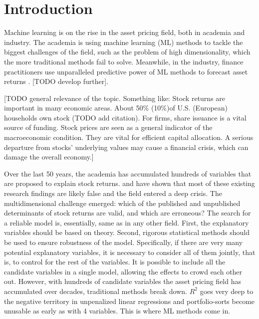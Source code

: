 \chapter{Introduction}
\label{chap:int}

Machine learning is on the rise in the asset pricing field, both in academia and industry. The academia is using machine learning (ML) methods to tackle the biggest challenges of the field, such as the problem of high dimensionality, which the more traditional methods fail to solve. Meanwhile, in the industry, finance practitioners use unparalleled predictive power of ML methods to forecast asset returns \citep{gu2020empirical}. [TODO develop further].    

[TODO general relevance of the topic. Something like: Stock returns are important in many economic areas. About 50\% (10\%)of U.S. (European) households own stock (TODO add citation). For firms, share issuance is a vital source of funding. Stock prices are seen as a general indicator of the macroeconomic condition. They are vital for efficient capital allocation. A serious departure from stocks' underlying values may cause a financial crisis, which can damage the overall economy.] 

Over the last 50 years, the academia has accumulated hundreds of variables that are proposed to explain stock returns. \cite{harvey2016and} and \cite{mclean2016does} have shown that most of these existing research findings are likely false and the field entered a deep crisis. The multidimensional challenge \citep{cochrane2011presidential} emerged: which of the published and unpublished determinants of stock returns are valid, and which are erroneous? The search for a reliable model is, essentially, same as in any other field. First, the explanatory variables should be based on theory. Second, rigorous statistical methods should be used to ensure robustness of the model. Specifically, if there are very many potential explanatory variables, it is necessary to consider all of them jointly, that is, to control for the rest of the variables. It is possible to include all the candidate variables in a single model, allowing the effects to crowd each other out. However, with hundreds of candidate variables the asset pricing field has accumulated over decades, traditional methods break down. $R^2$ goes very deep to the negative territory in unpenalized linear regressions \citep{gu2020empirical} and portfolio-sorts become unusable as early as with 4 variables. This is where ML methods come in. 

